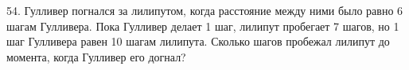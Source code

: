 54. Гулливер погнался за лилипутом, когда расстояние между ними было равно 6 шагам Гулливера. Пока Гулливер делает 1 шаг, лилипут пробегает 7 шагов, но 1 шаг Гулливера равен 10 шагам лилипута. Сколько шагов пробежал лилипут до момента, когда Гулливер его догнал?\\

